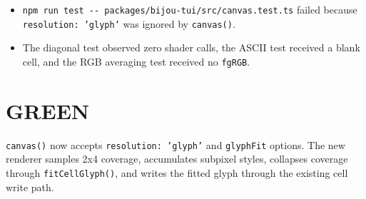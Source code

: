 \begin{itemize}
\tightlist
\item
  \texttt{n\allowbreak{}p\allowbreak{}m\allowbreak{} \allowbreak{}r\allowbreak{}u\allowbreak{}n\allowbreak{} \allowbreak{}t\allowbreak{}e\allowbreak{}s\allowbreak{}t\allowbreak{} \allowbreak{}-\allowbreak{}-\allowbreak{} \allowbreak{}p\allowbreak{}a\allowbreak{}c\allowbreak{}k\allowbreak{}a\allowbreak{}g\allowbreak{}e\allowbreak{}s\allowbreak{}/\allowbreak{}b\allowbreak{}i\allowbreak{}j\allowbreak{}o\allowbreak{}u\allowbreak{}-\allowbreak{}t\allowbreak{}u\allowbreak{}i\allowbreak{}/\allowbreak{}s\allowbreak{}r\allowbreak{}c\allowbreak{}/\allowbreak{}c\allowbreak{}a\allowbreak{}n\allowbreak{}v\allowbreak{}a\allowbreak{}s\allowbreak{}.\allowbreak{}t\allowbreak{}e\allowbreak{}s\allowbreak{}t\allowbreak{}.\allowbreak{}t\allowbreak{}s} failed because \texttt{r\allowbreak{}e\allowbreak{}s\allowbreak{}o\allowbreak{}l\allowbreak{}u\allowbreak{}t\allowbreak{}i\allowbreak{}o\allowbreak{}n\allowbreak{}:\allowbreak{} \allowbreak{}'\allowbreak{}g\allowbreak{}l\allowbreak{}y\allowbreak{}p\allowbreak{}h\allowbreak{}'} was ignored by \texttt{c\allowbreak{}a\allowbreak{}n\allowbreak{}v\allowbreak{}a\allowbreak{}s\allowbreak{}(\allowbreak{})}.
\item
  The diagonal test observed zero shader calls, the ASCII test received a blank cell, and the RGB averaging test received no \texttt{f\allowbreak{}g\allowbreak{}R\allowbreak{}G\allowbreak{}B}.
\end{itemize}

\section{GREEN}\label{record-162-green}

\texttt{c\allowbreak{}a\allowbreak{}n\allowbreak{}v\allowbreak{}a\allowbreak{}s\allowbreak{}(\allowbreak{})} now accepts \texttt{r\allowbreak{}e\allowbreak{}s\allowbreak{}o\allowbreak{}l\allowbreak{}u\allowbreak{}t\allowbreak{}i\allowbreak{}o\allowbreak{}n\allowbreak{}:\allowbreak{} \allowbreak{}'\allowbreak{}g\allowbreak{}l\allowbreak{}y\allowbreak{}p\allowbreak{}h\allowbreak{}'} and \texttt{g\allowbreak{}l\allowbreak{}y\allowbreak{}p\allowbreak{}h\allowbreak{}F\allowbreak{}i\allowbreak{}t} options. The new renderer samples 2x4 coverage, accumulates subpixel styles, collapses coverage through \texttt{f\allowbreak{}i\allowbreak{}t\allowbreak{}C\allowbreak{}e\allowbreak{}l\allowbreak{}l\allowbreak{}G\allowbreak{}l\allowbreak{}y\allowbreak{}p\allowbreak{}h\allowbreak{}(\allowbreak{})}, and writes the fitted glyph through the existing cell write path.

